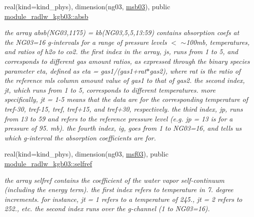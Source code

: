\begin{DoxyCompactItemize}
\mbox{\label{group__module__radlw__kgbnn_gaa84ba66e0a3cc018b03bd13c9c21e133}} 
real(kind=kind\+\_\+phys), dimension(ng03, \hyperlink{group__module__radlw__kgbnn_gac57ba9584cbc3a5e4e2e0a6b548d21e9}{msb03}), public \hyperlink{group__module__radlw__kgbnn_gaa84ba66e0a3cc018b03bd13c9c21e133}{module\+\_\+radlw\+\_\+kgb03\+::absb}
\begin{DoxyCompactList}\small\item\em the array absb(\+N\+G03,1175) = kb(\+N\+G03,5,5,13\+:59) contains absorption coefs at the N\+G03=16 g-\/intervals for a range of pressure levels $<$ $\sim$100mb, temperatures, and ratios of h2o to co2. the first index in the array, js, runs from 1 to 5, and corresponds to different gas amount ratios, as expressed through the binary species parameter eta, defined as eta = gas1/(gas1+rat$\ast$gas2), where rat is the ratio of the reference mls column amount value of gas1 to that of gas2. the second index, jt, which runs from 1 to 5, corresponds to different temperatures. more specifically, jt = 1-\/5 means that the data are for the corresponding temperature of tref-\/30, tref-\/15, tref, tref+15, and tref+30, respectively. the third index, jp, runs from 13 to 59 and refers to the reference pressure level (e.\+g. jp = 13 is for a pressure of 95. mb). the fourth index, ig, goes from 1 to N\+G03=16, and tells us which g-\/interval the absorption coefficients are for. \end{DoxyCompactList}\item 
\mbox{\label{group__module__radlw__kgbnn_ga6bb40d898660e6dfc056d3efe1d0c544}} 
real(kind=kind\+\_\+phys), dimension(ng03, \hyperlink{group__module__radlw__kgbnn_gaf553bb46aa3ea6bcbb945cb2c2778955}{msf03}), public \hyperlink{group__module__radlw__kgbnn_ga6bb40d898660e6dfc056d3efe1d0c544}{module\+\_\+radlw\+\_\+kgb03\+::selfref}
\begin{DoxyCompactList}\small\item\em the array selfref contains the coefficient of the water vapor self-\/continuum (including the energy term). the first index refers to temperature in 7. degree increments. for instance, jt = 1 refers to a temperature of 245., jt = 2 refers to 252., etc. the second index runs over the g-\/channel (1 to N\+G03=16). \end{DoxyCompactList}\item 
\mbox{\label{group__module__radlw__kgbnn_ga26e901a002e789933c5c9b622f3a0932}} 

\end{DoxyCompactItemize}
